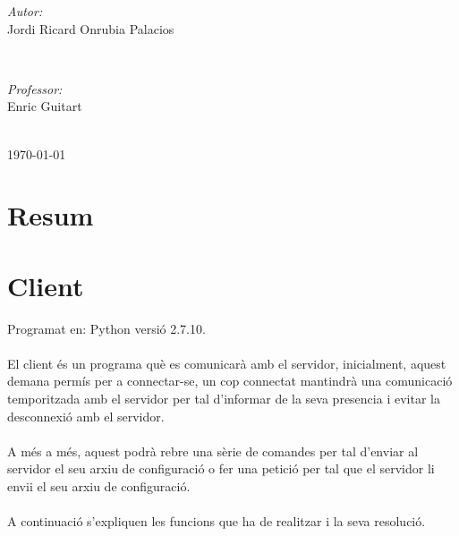 \documentclass[11pt]{article}
\begin{document}
\begin{titlepage}
\begin{minipage}{0.4\textwidth}
\begin{flushleft} \large
\emph{Autor:}\\
Jordi Ricard Onrubia Palacios %
\end{flushleft}
\end{minipage}
~
\begin{minipage}{0.4\textwidth}
\begin{flushright} \large
\emph{Professor:} \\
Enric Guitart %
\end{flushright}
\end{minipage}\\[4cm]

{\large \today}\\[3cm] %
\vfill %
\end{titlepage}

\newpage
\section*{Resum}
\justify
\thispagestyle{empty}

\newpage
\thispagestyle{empty}
\tableofcontents


\newpage
\clearpage
{}
\section{Client}
\justify
Programat en: Python versió 2.7.10.
\\\\
El client és un programa què es comunicarà amb el servidor, inicialment, aquest demana permís per a connectar-se, un cop connectat mantindrà una comunicació temporitzada amb el servidor per tal d'informar de la seva presencia i evitar la desconnexió amb el servidor.
\\\\
A més a més, aquest podrà rebre una sèrie de comandes per tal d'enviar al servidor el seu arxiu de configuració o fer una petició per tal que el servidor li envii el seu arxiu de configuració.
\\\\
A continuació s'expliquen les funcions que ha de realitzar i la seva resolució.
\end{document}
